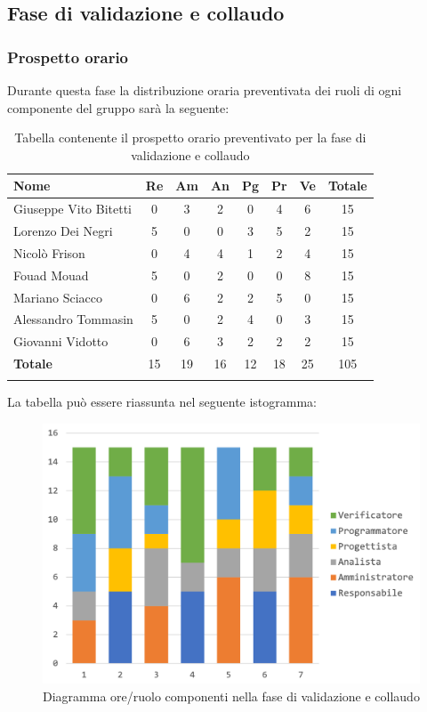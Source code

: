 	
	\subsection{Fase di validazione e collaudo}
		\subsubsection{Prospetto orario}
		Durante questa fase la distribuzione oraria preventivata dei ruoli di ogni componente del gruppo sarà la seguente:
		
		\begin{longtable}{|l|c|c|c|c|c|c|c|}
			\hline
			\rowcolor{lighter-grayer}
			\textbf{Nome} & \textbf{Re} & \textbf{Am} & \textbf{An} & \textbf{Pg}  & \textbf{Pr}   & \textbf{Ve} & \textbf{Totale} \\
			\hline
			\endfirsthead
			
			\hline
			Giuseppe Vito Bitetti 		 & 0 & 3 & 2 & 0 & 4 & 6 & 15\\
			\hline
			\hline
			Lorenzo Dei Negri			 & 5 & 0 & 0 & 3 & 5 & 2 & 15\\
			\hline
			\hline
			Nicolò Frison				      & 0 & 4 & 4 & 1 & 2 & 4 & 15\\
			\hline
			\hline
			Fouad Mouad 				   & 5 & 0 & 2 & 0 & 0 & 8 & 15\\
			\hline
			\hline
			Mariano Sciacco 			 & 0 & 6 & 2 & 2 & 5 & 0 & 15\\
			\hline
			\hline
			Alessandro Tommasin    & 5 & 0 & 2 & 4 & 0 & 3 & 15\\
			\hline
			\hline
			Giovanni Vidotto 			  & 0 & 6 & 3 & 2 & 2 & 2 & 15\\
			\hline 
			\textbf{Totale}			 	& 15 & 19 & 16 & 12 & 18 & 25 & 105\\
			\hline
			\caption{Tabella contenente il prospetto orario preventivato per la fase di validazione e collaudo}
		\end{longtable}
		
		La tabella può essere riassunta nel seguente istogramma:
		\begin{figure}[H]
			\centering
			\includegraphics[width=0.8\linewidth]{./images/preventivo/validColl1.png}
			\caption{Diagramma ore/ruolo componenti nella fase di validazione e collaudo}
			\label{fig:diagramma suddivione ruoli fase di validazione e collaudo}
		\end{figure}
		\pagebreak
		
